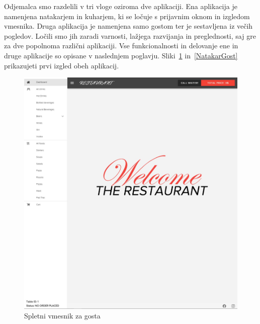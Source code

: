 \documentclass[a4paper, 12pt]{book}
\begin{document}
Odjemalca smo razdelili v tri vloge oziroma dve aplikaciji. Ena aplikacija je namenjena natakarjem in kuharjem, ki se ločuje s prijavnim oknom in izgledom vmesnika. Druga aplikacija je namenjena samo gostom ter je sestavljena iz večih pogledov. Ločili smo jih zaradi varnosti, lažjega razvijanja in preglednosti, saj gre za dve popolnoma različni aplikaciji. Vse funkcionalnosti in delovanje ene in druge aplikacije so opisane v naslednjem poglavju. Sliki~\ref{Gost} in~\ref{NatakarGost} prikazujeti prvi izgled obeh aplikacij.

\begin{figure}[!htb]
\begin{center}
\includegraphics[width=12.5cm]{gost_1.jpg}
\end{center}
\caption{Spletni vmesnik za gosta}
\label{Gost}
\end{figure}
\end{document}
